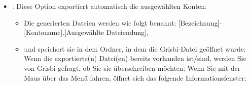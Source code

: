 \begin{enumerate}
\begin{itemize}
\begin{itemize}
\begin{itemize}
							\item {}: Wenn diese Option aktiviert ist (Standard), werden Datumsangaben wie andere Daten in Anführungszeichen gesetzt. Wenn Sie mit der Maus über das Menü fahren, öffnet sich ein Informationsfenster ;
						\end{itemize}
				\end{itemize}
			\item {}: Diese Option exportiert automatisch die ausgewählten Konten:
				\begin{itemize}
					\item Die generierten Dateien werden wie folgt benannt:\newline
					[Bezeichnung]-[Kontoname].[Ausgewählte Dateiendung],
					\item und speichert sie in dem Ordner, in dem die Grisbi-Datei geöffnet wurde; Wenn die exportierte(n) Datei(en) bereits vorhanden ist/sind, werden Sie von Grisbi gefragt, ob Sie sie überschreiben möchten; Wenn Sie mit der Maus über das Menü fahren, öffnet sich das folgende Informationsfenster:\newline

\end{itemize}
\end{itemize}
\end{enumerate}
